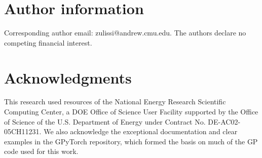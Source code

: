 \documentclass[]{achemso}
\begin{document}
\section*{Author information} Corresponding author email:  zulissi@andrew.cmu.edu.
The authors declare no competing financial interest.

\section*{Acknowledgments} This research used resources of the National Energy Research Scientific Computing Center, a DOE Office of Science User Facility supported by the Office of Science of the U.S. Department of Energy under Contract No. DE-AC02-05CH11231. %
We also acknowledge the exceptional documentation and clear examples in the GPyTorch\cite{Gardner2018} repository, which formed the basis on much of the \gls{GP} code used for this work.



\clearpage

\end{document}
